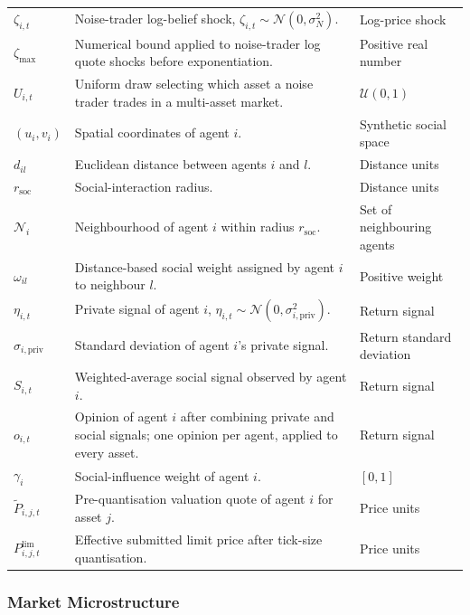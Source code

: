 \documentclass[12pt, a4paper]{article}
\begin{document}
\begin{longtable}{@{}L{0.22\textwidth}L{0.50\textwidth}L{0.20\textwidth}@{}}
        \(\zeta_{i,t}\) & Noise-trader log-belief shock, \(\zeta_{i,t}\sim\mathcal{N}(0,\sigma_N^2)\). & Log-price shock \\
        \(\zeta_{\max}\) & Numerical bound applied to noise-trader log quote shocks before exponentiation. & Positive real number \\
        \(U_{i,t}\) & Uniform draw selecting which asset a noise trader trades in a multi-asset market. & \(\mathcal{U}(0,1)\) \\
        \((u_i,v_i)\) & Spatial coordinates of agent \(i\). & Synthetic social space \\
        \(d_{il}\) & Euclidean distance between agents \(i\) and \(l\). & Distance units \\
        \(r_{\mathrm{soc}}\) & Social-interaction radius. & Distance units \\
        \(\mathcal{N}_i\) & Neighbourhood of agent \(i\) within radius \(r_{\mathrm{soc}}\). & Set of neighbouring agents \\
        \(\omega_{il}\) & Distance-based social weight assigned by agent \(i\) to neighbour \(l\). & Positive weight \\
        \(\eta_{i,t}\) & Private signal of agent \(i\), \(\eta_{i,t}\sim\mathcal{N}(0,\sigma_{i,\text{priv}}^2)\). & Return signal \\
        \(\sigma_{i,\text{priv}}\) & Standard deviation of agent \(i\)'s private signal. & Return standard deviation \\
        \(S_{i,t}\) & Weighted-average social signal observed by agent \(i\). & Return signal \\
        \(o_{i,t}\) & Opinion of agent \(i\) after combining private and social signals; one opinion per agent, applied to every asset. & Return signal \\
        \(\gamma_i\) & Social-influence weight of agent \(i\). & \([0,1]\) \\
        \(\tilde P_{i,j,t}\) & Pre-quantisation valuation quote of agent \(i\) for asset \(j\). & Price units \\
        \(P_{i,j,t}^{\text{lim}}\) & Effective submitted limit price after tick-size quantisation. & Price units \\
        \bottomrule
    \end{longtable}

    \subsubsection*{Market Microstructure}
\end{document}
